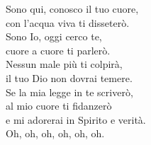 
\strofa Sono qui, conosco il tuo cuore,\\
con l'acqua viva ti disseterò.\\
Sono Io, oggi cerco te,\\
cuore a cuore ti parlerò.\\
Nessun male più ti colpirà,\\
il tuo Dio non dovrai temere.\\
Se la mia legge in te scriverò,\\
al mio cuore ti fidanzerò\\
e mi adorerai in Spirito e verità.\\
Oh, oh, oh, oh, oh, oh. 